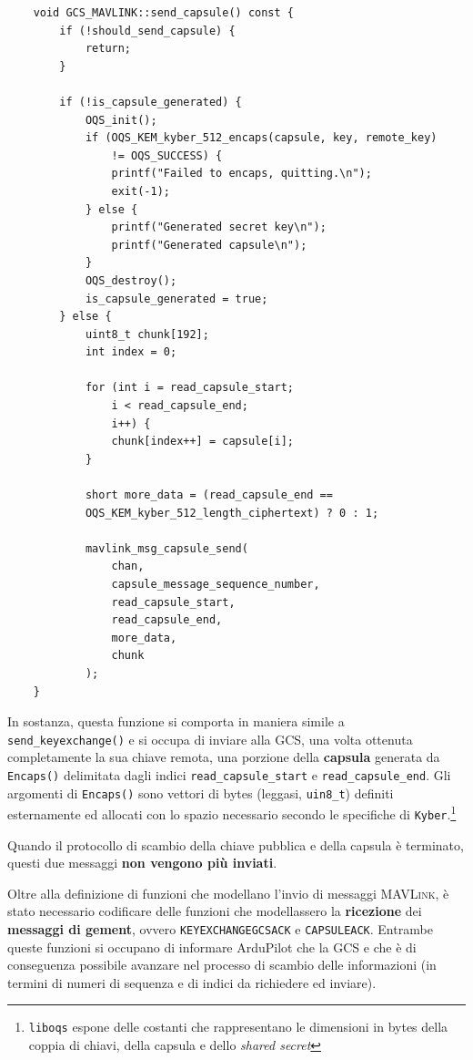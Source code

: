 \documentclass[a4paper, 12pt, oneside]{article}
\theoremstyle{definition}
\begin{document}
\begin{verbatim}
    void GCS_MAVLINK::send_capsule() const {
        if (!should_send_capsule) {
            return;
        }

        if (!is_capsule_generated) {
            OQS_init();
            if (OQS_KEM_kyber_512_encaps(capsule, key, remote_key) 
                != OQS_SUCCESS) {
                printf("Failed to encaps, quitting.\n");
                exit(-1);
            } else {
                printf("Generated secret key\n");
                printf("Generated capsule\n");
            }
            OQS_destroy();
            is_capsule_generated = true;
        } else {
            uint8_t chunk[192];
            int index = 0;

            for (int i = read_capsule_start; 
                i < read_capsule_end; 
                i++) {
                chunk[index++] = capsule[i];
            }

            short more_data = (read_capsule_end == 
            OQS_KEM_kyber_512_length_ciphertext) ? 0 : 1;

            mavlink_msg_capsule_send(
                chan,
                capsule_message_sequence_number,
                read_capsule_start,
                read_capsule_end,
                more_data,
                chunk            
            );
    }
\end{verbatim}

In sostanza, questa funzione si comporta in maniera simile a \texttt{send\_keyexchange()} e si occupa di inviare alla GCS, una volta ottenuta completamente la sua chiave remota, una porzione della \textbf{capsula} generata da \texttt{Encaps()} delimitata dagli indici \texttt{read\_capsule\_start} e \texttt{read\_capsule\_end}. Gli argomenti di \texttt{Encaps()} sono vettori di bytes (leggasi, \texttt{uin8\_t}) definiti esternamente ed allocati con lo spazio necessario secondo le specifiche di \texttt{Kyber}.\footnote{\texttt{liboqs} espone delle costanti che rappresentano le dimensioni in bytes della coppia di chiavi, della capsula e dello \textit{shared secret}}

Quando il protocollo di scambio della chiave pubblica e della capsula è terminato, questi due messaggi \textbf{non vengono più inviati}.

Oltre alla definizione di funzioni che modellano l'invio di messaggi \textsc{MAVLink}, è stato necessario codificare delle funzioni che modellassero la \textbf{ricezione} dei \textbf{messaggi di gement}, ovvero \texttt{KEYEXCHANGEGCSACK} e \texttt{CAPSULEACK}. Entrambe queste funzioni si occupano di informare ArduPilot che la GCS e che è di conseguenza possibile avanzare nel processo di scambio delle informazioni (in termini di numeri di sequenza e di indici da richiedere ed inviare).
\end{document}
